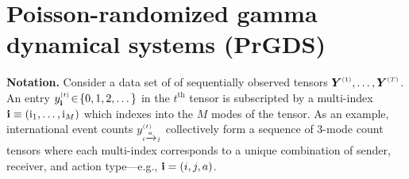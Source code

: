 \documentclass{article}
\begin{document}


\section{Poisson-randomized gamma dynamical systems (PrGDS)}
\label{sec:prgds}

\textbf{Notation.} Consider a data set of of sequentially observed tensors $\boldsymbol{Y}^{\mathsmaller{(1)}},\dots,\boldsymbol{Y}^{\mathsmaller{(T)}}$. An entry $\ydt \!\in\! \{0,1,2,\dots\}$ in the $t^{\textrm{th}}$ tensor is subscripted by a multi-index $\textbf{\textrm{i}} \equiv (\textrm{i}_1,\dots,\textrm{i}_M)$ which indexes into the $M$ modes of the tensor. As an example, international event counts $y^{\mathsmaller{(t)}}_{\mathsmaller{i \xrightarrow{a} j}}$ collectively form a sequence of 3-mode count tensors where each multi-index corresponds to a unique combination of sender, receiver, and action type---e.g., $\textbf{\textrm{i}} = (i, j, a)$.
\end{document}
